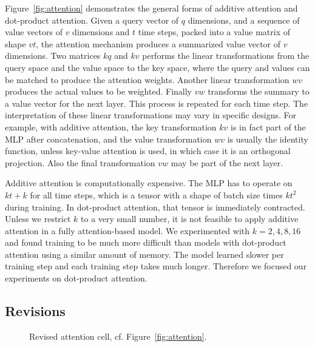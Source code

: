 \documentclass[11pt,twocolumn]{article}
\DeclareMathOperator{\softmax}{softmax}
\begin{document}
Figure~\ref{fig:attention} demonstrates the general forms of additive attention and dot-product attention.
Given a query vector of \(q\) dimensions,
and a sequence of value vectors of \(v\) dimensions and \(t\) time steps,
packed into a value matrix of shape \(vt\),
the attention mechanism produces a summarized value vector of \(v\) dimensions.
Two matrices \(kq\) and \(kv\) performs the linear transformations
from the query space and the value space to the key space,
where the query and values can be matched to produce the attention weights.
Another linear transformation \(wv\) produces the actual values to be weighted.
Finally \(vw\) transforms the summary to a value vector for the next layer.
This process is repeated for each time step.
The interpretation of these linear transformations may vary in specific designs.
For example, with additive attention,
the key transformation \(kv\) is in fact part of the MLP after concatenation,
and the value transformation \(wv\) is usually the identity function,
unless key-value attention is used, in which case it is an orthogonal projection.
Also the final transformation \(vw\) may be part of the next layer.

Additive attention is computationally expensive.
The MLP has to operate on \(kt + k\) for all time steps,
which is a tensor with a shape of batch size times \(kt^{2}\) during training.
In dot-product attention, that tensor is immediately contracted.
Unless we restrict \(k\) to a very small number,
it is not feasible to apply additive attention in a fully attention-based model.
We experimented with \(k = 2, 4, 8, 16\) and found training to be much more difficult than
models with dot-product attention using a similar amount of memory.
The model learned slower per training step and each training step takes much longer.
Therefore we focused our experiments on dot-product attention.

\subsection{Revisions}

\begin{figure}
  \centering
  \caption{\label{fig:revis}Revised attention cell, cf. Figure~\ref{fig:attention}.}
\end{figure}
\end{document}
